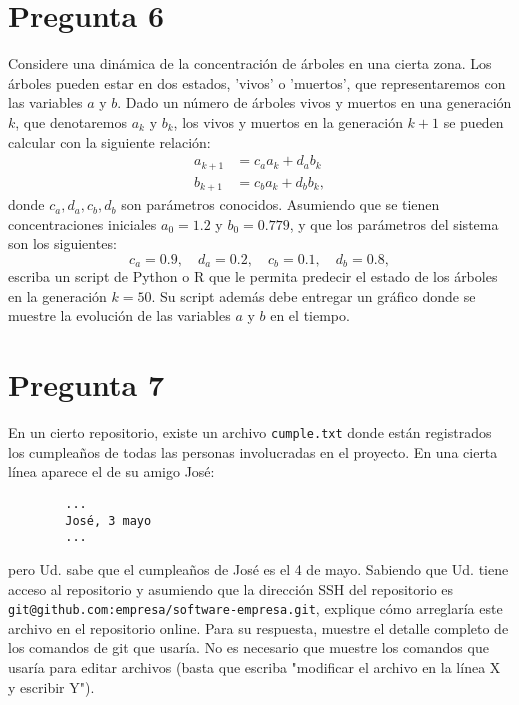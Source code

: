 \documentclass{article}
\begin{document}
\section*{Pregunta 6}
Considere una dinámica de la concentración de árboles en una cierta zona. Los árboles pueden estar en dos estados, 'vivos' o 'muertos', que representaremos con las variables $a$ y $b$. Dado un número de árboles vivos y muertos en una generación $k$, que denotaremos $a_k$ y $b_k$, los vivos y muertos en la generación $k+1$ se pueden calcular con la siguiente relación:
    $$ 
    \begin{aligned}
        a_{k+1} &= c_a a_k + d_a b_k \\
        b_{k+1} &= c_b a_k + d_b b_k, 
    \end{aligned} 
    $$
donde $c_a,d_a,c_b,d_b$ son parámetros conocidos. Asumiendo que se tienen concentraciones iniciales $a_0=1.2$ y $b_0=0.779$, y que los parámetros del sistema son los siguientes:
    $$ c_a = 0.9, \quad d_a = 0.2, \quad c_b = 0.1, \quad d_b = 0.8, $$
escriba un script de Python o R que le permita predecir el estado de los árboles en la generación $k=50$. Su script además debe entregar un gráfico donde se muestre la evolución de las variables $a$ y $b$ en el tiempo. 
\section*{Pregunta 7}
En un cierto repositorio, existe un archivo \texttt{cumple.txt} donde están registrados los cumpleaños de todas las personas involucradas en el proyecto. En una cierta línea aparece el de su amigo José:

    \begin{verbatim}
        ... 
        José, 3 mayo
        ...
    \end{verbatim}
pero Ud. sabe que el cumpleaños de José es el 4 de mayo. Sabiendo que Ud. tiene acceso al repositorio y asumiendo que la dirección SSH del repositorio es \texttt{git@github.com:empresa/software-empresa.git}, explique cómo arreglaría este archivo en el repositorio online. Para su respuesta, muestre el detalle completo de los comandos de git que usaría. No es necesario que muestre los comandos que usaría para editar archivos (basta que escriba "modificar el archivo en la línea X y escribir Y"). 
\end{document}
